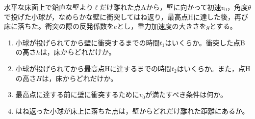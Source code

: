 \hakosyokika
\item
    \begin{mawarikomi}{120pt}{}
        水平な床面上で鉛直な壁より$\ell $だけ離れた点Aから，壁に向かって初速$v_0$，角度$\theta $で投げた小球が，なめらかな壁に衝突してはね返り，最高点Hに達した後，再び床に落ちた。衝突の際の反発係数を$e$とし，重力加速度の大きさを$g$とする。
        \begin{enumerate}
            \item 小球が投げられてから壁に衝突するまでの時間$t_1$はいくらか。衝突した点Bの高さ$h$は，床からどれだけか。
            \item 小球が投げられてから最高点Hに達するまでの時間$t_2$はいくらか。また，点Hの高さ$H$は，床からどれだけか。
            \item 最高点に達する前に壁に衝突するために$v_0$が満たすべき条件は何か。
            \item はね返った小球が床上に落ちた点は，壁からどれだけ離れた距離にあるか。
        \end{enumerate}
    \end{mawarikomi}